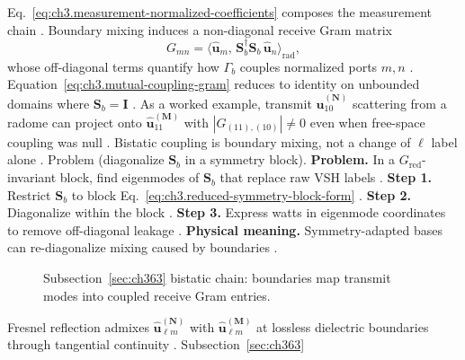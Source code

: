 Eq.~\eqref{eq:ch3.measurement-normalized-coefficients} composes the measurement chain \cite{harrington2001}.
Boundary mixing induces a non-diagonal receive Gram matrix
\begin{equation}
\label{eq:ch3.mutual-coupling-gram}
G_{mn}
=
\langle\widehat{\mathbf{u}}_{m},\,\mathbf{S}_{b}^{\dagger}\mathbf{S}_{b}\,\widehat{\mathbf{u}}_{n}\rangle_{\mathrm{rad}},
\end{equation}
whose off-diagonal terms quantify how \(\Gamma_{b}\) couples normalized ports \(m,n\) \cite{harrington2001}.
Equation~\eqref{eq:ch3.mutual-coupling-gram} reduces to identity on unbounded domains where \(\mathbf{S}_{b}=\mathbf{I}\)
\cite{hansen1988}.
As a worked example, transmit \(\widehat{\mathbf{u}}_{10}^{(\mathbf{N})}\) scattering from a radome can project onto
\(\widehat{\mathbf{u}}_{11}^{(\mathbf{M})}\) with \(|G_{(11),(10)}|\neq0\) even when free-space coupling was null
\cite{harrington2001}. Bistatic coupling is boundary mixing, not a change of \(\ell\) label alone
\cite{hansen1988}.
Problem (diagonalize \(\mathbf{S}_{b}\) in a symmetry block). \textbf{Problem.} In a \(G_{\mathrm{red}}\)-invariant block, find eigenmodes of \(\mathbf{S}_{b}\) that replace raw VSH
labels \cite{jackson1999}.
\textbf{Step 1.} Restrict \(\mathbf{S}_{b}\) to block Eq.~\eqref{eq:ch3.reduced-symmetry-block-form} \cite{hansen1988}.
\textbf{Step 2.} Diagonalize within the block \cite{harrington2001}.
\textbf{Step 3.} Express watts in eigenmode coordinates to remove off-diagonal leakage \cite{stratton1941}.
\textbf{Physical meaning.} Symmetry-adapted bases can re-diagonalize mixing caused by boundaries \cite{harrington2001}.
\begin{figure}[t]
\centering
{}
\caption{Subsection~\ref{sec:ch363} bistatic chain: boundaries map transmit modes into coupled receive Gram entries.}
\label{fig:ch3.363-bistatic-gram}
\end{figure}
Fresnel reflection admixes \(\widehat{\mathbf{u}}_{\ell m}^{(\mathbf{N})}\) with \(\widehat{\mathbf{u}}_{\ell m}^{(\mathbf{M})}\)
at lossless dielectric boundaries through tangential continuity \cite{jackson1999}. Subsection~\ref{sec:ch363}
